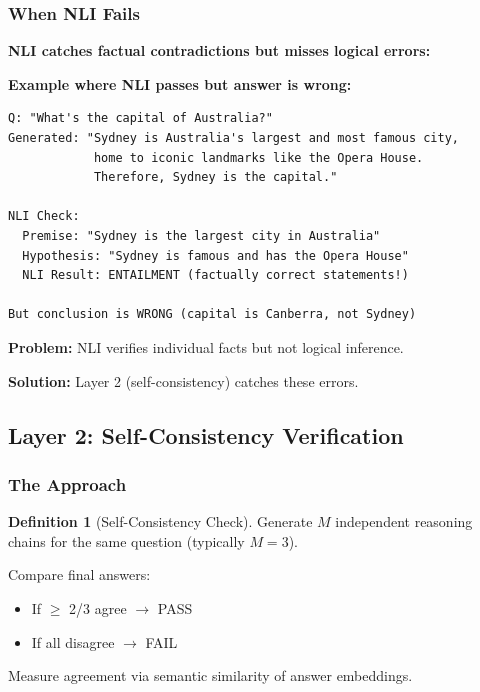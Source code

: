 \documentclass[12pt,a4paper]{article}
\theoremstyle{definition}
\newtheorem{definition}[theorem]{Definition}
\begin{document}
\subsubsection{When NLI Fails}

\begin{whybox}
\textbf{NLI catches factual contradictions but misses logical errors:}

\textbf{Example where NLI passes but answer is wrong:}

\begin{verbatim}
Q: "What's the capital of Australia?"
Generated: "Sydney is Australia's largest and most famous city, 
            home to iconic landmarks like the Opera House. 
            Therefore, Sydney is the capital."

NLI Check:
  Premise: "Sydney is the largest city in Australia"
  Hypothesis: "Sydney is famous and has the Opera House"
  NLI Result: ENTAILMENT (factually correct statements!)

But conclusion is WRONG (capital is Canberra, not Sydney)
\end{verbatim}

\textbf{Problem:} NLI verifies individual facts but not logical inference.

\textbf{Solution:} Layer 2 (self-consistency) catches these errors.
\end{whybox}

\subsection{Layer 2: Self-Consistency Verification}

\subsubsection{The Approach}

\begin{definition}[Self-Consistency Check]
Generate $M$ independent reasoning chains for the same question (typically $M=3$).

Compare final answers:
\begin{itemize}
    \item If $\geq$ 2/3 agree $\rightarrow$ PASS
    \item If all disagree $\rightarrow$ FAIL
\end{itemize}

Measure agreement via semantic similarity of answer embeddings.
\end{definition}
\end{document}
